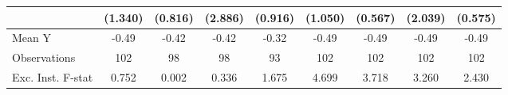 {\begin{tabular}{l*{8}{c}}
                    &     (1.340)         &     (0.816)         &     (2.886)         &     (0.916)         &     (1.050)         &     (0.567)         &     (2.039)         &     (0.575)         \\
\midrule
Mean Y              &       -0.49         &       -0.42         &       -0.42         &       -0.32         &       -0.49         &       -0.49         &       -0.49         &       -0.49         \\
Observations        &         102         &          98         &          98         &          93         &         102         &         102         &         102         &         102         \\
Exc. Inst. F-stat   &       0.752         &       0.002         &       0.336         &       1.675         &       4.699         &       3.718         &       3.260         &       2.430         \\
\bottomrule
\end{tabular}
}
